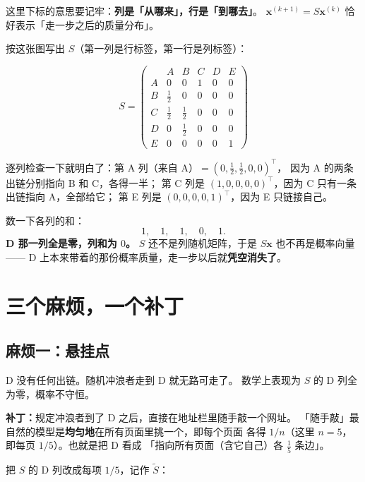 \documentclass[UTF8,11pt,fontset=macnew]{ctexart}
\newcommand{\xv}{\mathbf{x}}
\begin{document}
这里下标的意思要记牢：\textbf{列是「从哪来」，行是「到哪去」}。
$\xv^{(k+1)} = S\xv^{(k)}$ 恰好表示「走一步之后的质量分布」。

按这张图写出 $S$（第一列是行标签，第一行是列标签）：

\[
S=\left(\begin{array}{c|ccccc}
   & A & B & C & D & E\\ \hline
A  & 0            & 0            & 1            & 0 & 0\\[1mm]
B  & \frac{1}{2}  & 0            & 0            & 0 & 0\\[1mm]
C  & \frac{1}{2}  & \frac{1}{2}  & 0            & 0 & 0\\[1mm]
D  & 0            & \frac{1}{2}  & 0            & 0 & 0\\[1mm]
E  & 0            & 0            & 0            & 0 & 1
\end{array}\right)
\]

逐列检查一下就明白了：第 A 列（来自 A）$=(0,\frac12,\frac12,0,0)^\top$，
因为 A 的两条出链分别指向 B 和 C，各得一半；
第 C 列是 $(1,0,0,0,0)^\top$，因为 C 只有一条出链指向 A，全部给它；
第 E 列是 $(0,0,0,0,1)^\top$，因为 E 只链接自己。

\begin{warnbox}[问题来了]
数一下各列的和：
\[
1,\quad 1,\quad 1,\quad \boxed{0},\quad 1 .
\]
\textbf{D 那一列全是零，列和为 $0$。}
$S$ 还不是列随机矩阵，于是 $S\xv$ 也不再是概率向量——
D 上本来带着的那份概率质量，走一步以后就\textbf{凭空消失了}。
\end{warnbox}

\section{三个麻烦，一个补丁}
\label{sec:trouble}

\subsection{麻烦一：悬挂点}

D 没有任何出链。随机冲浪者走到 D 就无路可走了。
数学上表现为 $S$ 的 D 列全为零，概率不守恒。

\textbf{补丁：}规定冲浪者到了 D 之后，直接在地址栏里随手敲一个网址。
「随手敲」最自然的模型是\textbf{均匀地}在所有页面里挑一个，即每个页面
各得 $1/n$（这里 $n=5$，即每页 $1/5$）。也就是把 D 看成
「指向所有页面（含它自己）各 $\frac15$ 条边」。

把 $S$ 的 D 列改成每项 $1/5$，记作 $\tilde S$：
\end{document}
